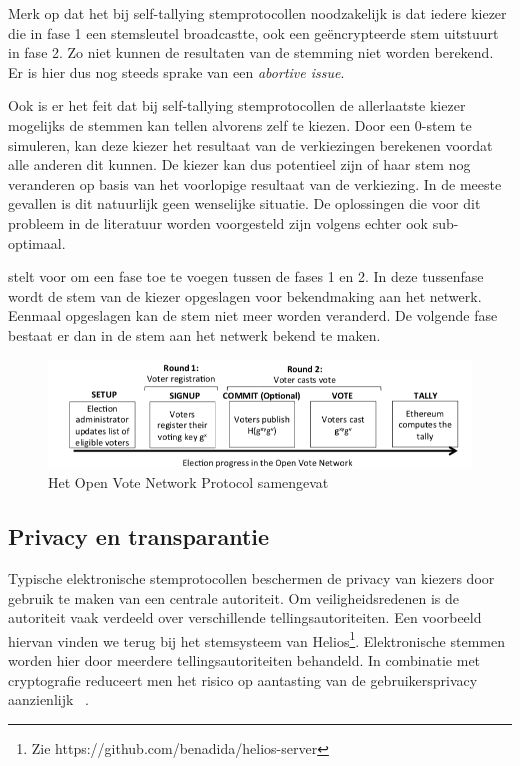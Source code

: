 			Merk op dat het bij self-tallying stemprotocollen noodzakelijk is dat iedere kiezer die in fase 1 een stemsleutel broadcastte, ook een geëncrypteerde stem uitstuurt in fase 2. Zo niet kunnen de resultaten van de stemming niet worden berekend. Er is hier dus nog steeds sprake van een \textit{abortive issue}.
			
			Ook is er het feit dat bij self-tallying stemprotocollen de allerlaatste kiezer mogelijks de stemmen kan tellen alvorens zelf te kiezen. Door een 0-stem te simuleren, kan deze kiezer het resultaat van de verkiezingen berekenen voordat alle anderen dit kunnen. De kiezer kan dus potentieel zijn of haar stem nog veranderen op basis van het voorlopige resultaat van de verkiezing. In de meeste gevallen is dit natuurlijk geen wenselijke situatie. De oplossingen die voor dit probleem in de literatuur worden voorgesteld zijn volgens \textcite{McCorry2017} echter ook sub-optimaal. 
			
			\textcite{McCorry2017} stelt voor om een fase toe te voegen tussen de fases 1 en 2. In deze tussenfase wordt de stem van de kiezer opgeslagen voor bekendmaking aan het netwerk. Eenmaal opgeslagen kan de stem niet meer worden veranderd. De volgende fase bestaat er dan in de stem aan het netwerk bekend te maken. 

			\begin{figure}
				\includegraphics[width=\linewidth]{img/ovnp.png}
				\caption{Het Open Vote Network Protocol samengevat}
				\label{fig:ovnp}
			\end{figure} 
	
	\newpage
	\subsection{Privacy en transparantie}
		Typische elektronische stemprotocollen beschermen de privacy van kiezers door gebruik te maken van een centrale autoriteit. Om veiligheidsredenen is de autoriteit vaak verdeeld over verschillende tellingsautoriteiten. Een voorbeeld hiervan vinden we terug bij het stemsysteem van Helios\footnote{Zie https://github.com/benadida/helios-server}. Elektronische stemmen worden hier door meerdere tellingsautoriteiten behandeld. In combinatie met cryptografie reduceert men het risico op aantasting van de gebruikersprivacy aanzienlijk ~\autocite{Adida2008}. 
	
